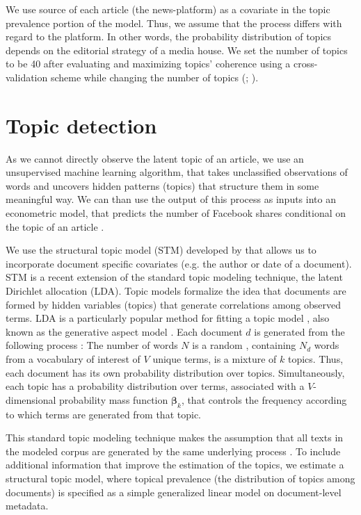 \documentclass[12pt,a4paper,notitlepage]{article}
\begin{document}
We use source of each article (the news-platform) as a covariate in the topic prevalence portion of the model. Thus, we assume that the process differs with regard to the platform. In other words, the probability distribution of topics depends on the editorial strategy of a media house. We set the number of topics to be 40 after evaluating and maximizing topics' coherence using a cross-validation scheme while changing the number of topics (\citet{airoldi_reconceptualizing_2010}; \citet{roberts_model_2016}).


\section{Topic detection}\label{ch_model}

As we cannot directly observe the latent topic of an article, we use an unsupervised machine learning algorithm, that takes unclassified observations of words and uncovers hidden patterns (topics) that structure them in some meaningful way. We can than use the output of this process as inputs into an econometric model, that predicts the number of Facebook shares conditional on the topic of an article \citep{gentzkow_text_2017}.  

We use the structural topic model (STM) developed by \citet{roberts_model_2016} that allows us to incorporate document specific covariates (e.g. the author or date of a document). STM is a recent extension of the standard topic modeling technique, the latent Dirichlet allocation (LDA). Topic models formalize the idea that documents are formed by hidden variables (topics) that generate correlations among observed terms. LDA is a particularly popular method for fitting a topic model \citep{blei_latent_2003}, also known as the generative aspect model \citep{minka_expectation-propagation_2002}. Each document $d$ is generated from the following process \citep{blei_latent_2003}: The number of words $N$ is a random  , containing $N_d$ words from a vocabulary of interest of $V$ unique terms, is a mixture of $k$ topics. Thus, each document has its own probability distribution over topics. Simultaneously, each topic has a probability distribution over terms, associated with a $V$-dimensional probability mass function $\boldsymbol{\beta}_k$, that controls the frequency according to which terms are generated from that topic. 

This standard topic modeling technique makes the assumption that all texts in the modeled corpus are generated by the same underlying process \citep{mishler_using_2015}. To include additional information that improve the estimation of the topics, we estimate a structural topic model, where topical prevalence (the distribution of topics among documents) is specified as a simple generalized linear model on document-level metadata. 
\end{document}
